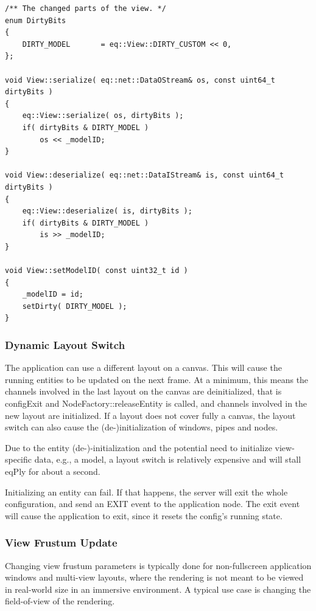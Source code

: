 \documentclass[10pt,a4]{scrartcl}
\begin{document}
{\footnotesize\begin{lstlisting}
/** The changed parts of the view. */
enum DirtyBits
{
    DIRTY_MODEL       = eq::View::DIRTY_CUSTOM << 0,
};

void View::serialize( eq::net::DataOStream& os, const uint64_t dirtyBits )
{
    eq::View::serialize( os, dirtyBits );
    if( dirtyBits & DIRTY_MODEL )
        os << _modelID;
}

void View::deserialize( eq::net::DataIStream& is, const uint64_t dirtyBits )
{
    eq::View::deserialize( is, dirtyBits );
    if( dirtyBits & DIRTY_MODEL )
        is >> _modelID;
}

void View::setModelID( const uint32_t id )
{
    _modelID = id;
    setDirty( DIRTY_MODEL );
}
\end{lstlisting}}


\subsubsection{Dynamic Layout Switch}

The application can use a different layout on a canvas. This will cause
the running entities to be updated on the next frame. At a minimum, this
means the channels involved in the last layout on the canvas are
deinitialized, that is \textsf{configExit} and
\textsf{NodeFactory::releaseEntity} is called, and channels involved in
the new layout are initialized. If a layout does not cover fully a
canvas, the layout switch can also cause the (de-)initialization of
windows, pipes and nodes.

Due to the entity (de-)-initialization and the potential need to
initialize view-specific data, e.g., a model, a layout switch is
relatively expensive and will stall \textsf{eqPly} for about a second.

Initializing an entity can fail. If that happens, the server will exit
the whole configuration, and send an \textsf{EXIT} event to the
application node. The exit event will cause the application to exit,
since it resets the config's running state.


\subsubsection{View Frustum Update}

Changing view frustum parameters is typically done for non-fullscreen
application windows and multi-view layouts, where the rendering is not
meant to be viewed in real-world size in an immersive environment. A
typical use case is changing the field-of-view of the rendering.
\end{document}
